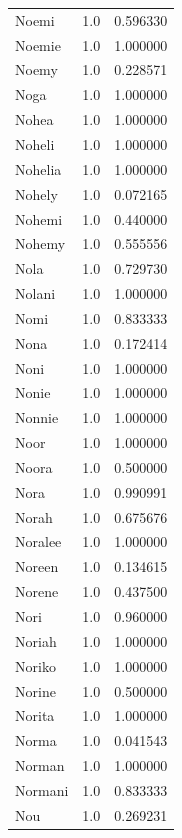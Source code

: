 \documentclass[
  letterpaper,
  DIV=11,
  numbers=noendperiod]{scrreprt}
\begin{document}
\begin{tabular}{lrr}
Noemi           &   1.0 &   0.596330 \\
Noemie          &   1.0 &   1.000000 \\
Noemy           &   1.0 &   0.228571 \\
Noga            &   1.0 &   1.000000 \\
Nohea           &   1.0 &   1.000000 \\
Noheli          &   1.0 &   1.000000 \\
Nohelia         &   1.0 &   1.000000 \\
Nohely          &   1.0 &   0.072165 \\
Nohemi          &   1.0 &   0.440000 \\
Nohemy          &   1.0 &   0.555556 \\
Nola            &   1.0 &   0.729730 \\
Nolani          &   1.0 &   1.000000 \\
Nomi            &   1.0 &   0.833333 \\
Nona            &   1.0 &   0.172414 \\
Noni            &   1.0 &   1.000000 \\
Nonie           &   1.0 &   1.000000 \\
Nonnie          &   1.0 &   1.000000 \\
Noor            &   1.0 &   1.000000 \\
Noora           &   1.0 &   0.500000 \\
Nora            &   1.0 &   0.990991 \\
Norah           &   1.0 &   0.675676 \\
Noralee         &   1.0 &   1.000000 \\
Noreen          &   1.0 &   0.134615 \\
Norene          &   1.0 &   0.437500 \\
Nori            &   1.0 &   0.960000 \\
Noriah          &   1.0 &   1.000000 \\
Noriko          &   1.0 &   1.000000 \\
Norine          &   1.0 &   0.500000 \\
Norita          &   1.0 &   1.000000 \\
Norma           &   1.0 &   0.041543 \\
Norman          &   1.0 &   1.000000 \\
Normani         &   1.0 &   0.833333 \\
Nou             &   1.0 &   0.269231 \\

\end{tabular}
\end{document}
